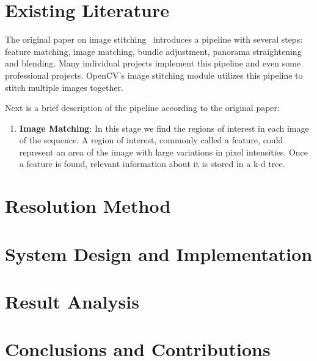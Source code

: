 \documentclass[12pt, a4paper]{article}
\begin{document}
\section{Existing Literature}
\label{sec:Literature}

The original paper on image stitching~\cite{brown2007automatic} introduces a 
pipeline with several steps: feature matching, image matching, bundle adjustment,
panorama straightening and blending. Many individual projects implement this 
pipeline and even some professional projects. OpenCV's image stitching module
utilizes this pipeline to stitch multiple images together.

Next is a brief description of the pipeline according to the original paper:
\begin{enumerate}
		\item \textbf{Image Matching}: In this stage we find the regions of 
				interest in each image of the sequence. A region of interest,
				commonly called a feature, could represent an area of the image
				with large variations in pixel intensities. Once a feature is 
				found, relevant information about it is stored in a k-d tree.


\end{enumerate}
\section{Resolution Method}
\label{sec:ResolutionMethod}

\section{System Design and Implementation}
\label{sec:DesignAndImplementation}

\section{Result Analysis}
\label{sec:Results}

\section{Conclusions and Contributions}
\label{sec:Conclusion}

\vspace{\fill}

\printbibliography
\end{document}
